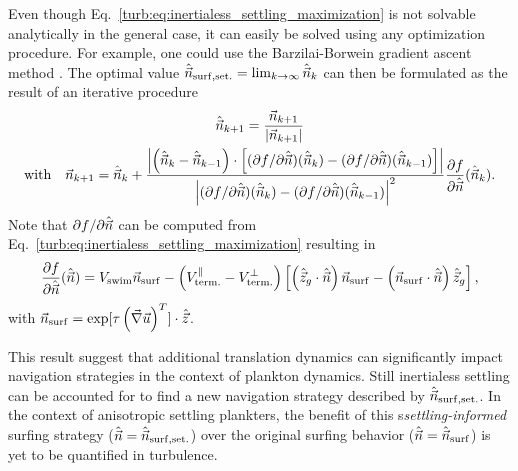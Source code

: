 Even though Eq.~\eqref{turb:eq:inertialess_settling_maximization} is not solvable analytically in the general case, it can easily be solved using any optimization procedure.
For example, one could use the Barzilai-Borwein gradient ascent method \citep{barzilai1988two, fletcher2005barzilai}. 
The optimal value $\ControlDirection_{\mathrm{\NameSurfShort, set.}} = \lim_{k\to\infty} \ControlDirection_k$ can then be formulated as the result of an iterative procedure
\begin{multline}
	 \ControlDirection_{k+1} = \frac{\ControlDirectionNN_{k+1}}{\norm*{\ControlDirectionNN_{k+1}}}\\ 
	 \text{with} \quad \ControlDirectionNN_{k+1} = \ControlDirection_k + \frac{\norm*{ \left(\ControlDirection_k - \ControlDirection_{k-1} \right) \cdot \left[ (\partial f / \partial \ControlDirection) (\ControlDirection_k)  - (\partial f / \partial \ControlDirection) (\ControlDirection_{k-1}) \right] } }{\norm*{(\partial f / \partial \ControlDirection) (\ControlDirection_k)  - (\partial f / \partial \ControlDirection) (\ControlDirection_{k-1})}^2} \frac{\partial f}{\partial \ControlDirection} (\ControlDirection_k).
\end{multline}
Note that $\partial f / \partial \ControlDirection$ can be computed from Eq.~\eqref{turb:eq:inertialess_settling_maximization} resulting in
\begin{equation}
	\frac{\partial f}{\partial \ControlDirection}(\ControlDirection) = \SwimmingVelocity \ControlDirectionOptNN - \left( \TerminalVelocityParallel - \TerminalVelocityOrthogonal \right) \left[ \left( \DirectionSettling \cdot \ControlDirection \right) \ControlDirectionOptNN - \left( \ControlDirectionOptNN \cdot \ControlDirection \right) \DirectionSettling \right],
\end{equation}
with $\ControlDirectionOptNN = \exp [ \TimeHorizon \left( \Gradients \right)^T ] \cdot \Direction$.

This result suggest that additional translation dynamics can significantly impact navigation strategies in the context of plankton dynamics.
Still inertialess settling can be accounted for to find a new navigation strategy described by $\ControlDirection_{\mathrm{\NameSurfShort, set.}}$.
In the context of anisotropic settling plankters, the benefit of this s\textit{settling-informed} surfing strategy ($\ControlDirection = \ControlDirection_{\mathrm{\NameSurfShort, set.}}$) over the original surfing behavior ($\ControlDirection = \ControlDirectionOpt$) is yet to be quantified in turbulence.

